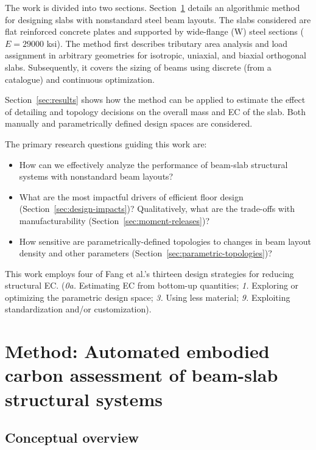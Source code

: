 \documentclass[10pt, letterpaper]{article} %
\begin{document}
    The work is divided into two sections. Section~\ref{sec:method} details an algorithmic method for designing slabs with nonstandard steel beam layouts. The slabs considered are flat reinforced concrete plates and supported by wide-flange (W) steel sections ($E = 29000$ ksi). The method first describes tributary area analysis and load assignment in arbitrary geometries for isotropic, uniaxial, and biaxial orthogonal slabs. Subsequently, it covers the sizing of beams using discrete (from a catalogue) and continuous optimization.

    Section~\ref{sec:results} shows how the method can be applied to estimate the effect of detailing and topology decisions on the overall mass and EC of the slab. Both manually and parametrically defined design spaces are considered.

    The primary research questions guiding this work are:

    \begin{itemize}
        \item How can we effectively analyze the performance of beam-slab structural systems with nonstandard beam layouts?
        \item What are the most impactful drivers of efficient floor design (Section~\ref{sec:design-impacts})? Qualitatively, what are the trade-offs with manufacturability (Section~\ref{sec:moment-releases})?
        \item How sensitive are parametrically-defined topologies to changes in beam layout density and other parameters (Section~\ref{sec:parametric-topologies})?
    \end{itemize}

    This work employs four of Fang et al.’s thirteen design strategies for reducing structural EC. (\textit{0a.} Estimating EC from bottom-up quantities; \textit{1.} Exploring or optimizing the parametric design space; \textit{3.} Using less material; \textit{9.} Exploiting standardization and/or customization).\cite{demifangReducingEmbodiedCarbon2023}

    \section{Method: Automated embodied carbon assessment of beam-slab structural systems}\label{sec:method}

    \subsection{Conceptual overview}
\end{document}
